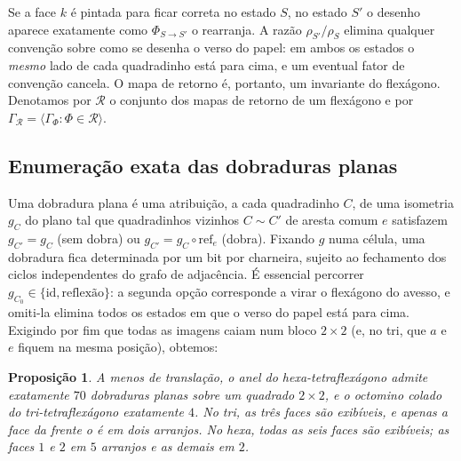 \documentclass[11pt,a4paper]{article}
\theoremstyle{plain}
\newtheorem{proposicao}[teorema]{Proposição}
\theoremstyle{definition}
\theoremstyle{remark}
\begin{document}
Se a face $k$ é pintada para ficar correta no estado $S$, no estado $S'$ o
desenho aparece exatamente como $\Phi_{S\to S'}$ o rearranja. A razão
$\rho_{S'}/\rho_S$ elimina qualquer convenção sobre como se desenha o verso do
papel: em ambos os estados o \emph{mesmo} lado de cada quadradinho está para
cima, e um eventual fator de convenção cancela. O mapa de retorno é, portanto,
um invariante do flexágono. Denotamos por $\mathcal{R}$ o conjunto dos mapas de
retorno de um flexágono e por $\Gamma_{\mathcal R}=\langle\Gamma_\Phi:
\Phi\in\mathcal R\rangle$.

\subsection{Enumeração exata das dobraduras planas}
Uma dobradura plana é uma atribuição, a cada quadradinho $C$, de uma isometria
$g_C$ do plano tal que quadradinhos vizinhos $C\sim C'$ de aresta comum $e$
satisfazem $g_{C'}=g_C$ (sem dobra) ou $g_{C'}=g_C\circ\mathrm{ref}_e$ (dobra).
Fixando $g$ numa célula, uma dobradura fica determinada por um bit por
charneira, sujeito ao fechamento dos ciclos independentes do grafo de
adjacência. É essencial percorrer $g_{C_0}\in\{\mathrm{id},\text{reflexão}\}$:
a segunda opção corresponde a virar o flexágono do avesso, e omiti-la elimina
todos os estados em que o verso do papel está para cima. Exigindo por fim que
todas as imagens caiam num bloco $2\times2$ (e, no tri, que $a$ e $e$ fiquem na
mesma posição), obtemos:

\begin{proposicao}\label{prop:enum}
A menos de translação, o anel do hexa-tetraflexágono admite exatamente $70$
dobraduras planas sobre um quadrado $2\times2$, e o octomino colado do
tri-tetraflexágono exatamente $4$. No tri, as três faces são exibíveis, e
apenas a face da frente o é em dois arranjos. No hexa, todas as seis faces são
exibíveis; as faces $1$ e $2$ em $5$ arranjos e as demais em $2$.
\end{proposicao}
\end{document}
